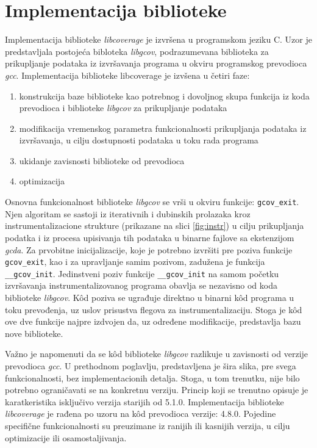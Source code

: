 \documentclass[12pt,oneside]{memoir}
\newcommand{\kod}[1]{\texttt{#1}}
\newcommand{\strano}[1]{\textit{#1}}
\begin{document}
\section{Implementacija biblioteke}

Implementacija biblioteke \strano{libcoverage} je izvršena u programskom jeziku C. Uzor je predstavljala postojeća bibloteka \strano{libgcov}, podrazumevana biblioteka za prikupljanje podataka iz izvršavanja programa u okviru programskog prevodioca \strano{gcc}. Implementacija biblioteke libcoverage je izvšena u četiri faze:
\begin{enumerate}
\item konstrukcija baze biblioteke kao potrebnog i dovoljnog skupa funkcija iz koda prevodioca i biblioteke \strano{libgcov} za prikupljanje podataka
\item modifikacija vremenskog parametra funkcionalnosti prikupljanja podataka iz izvršavanja, u cilju dostupnosti podataka u toku rada programa
\item ukidanje zavisnosti biblioteke od prevodioca
\item optimizacija
\end{enumerate}


Osnovna funkcionalnost biblioteke \strano{libgcov} se vrši u okviru funkcije: \kod{gcov\_exit}. Njen algoritam se sastoji iz iterativnih i dubinskih prolazaka kroz instrumentalizacione strukture (prikazane na slici \ref{fig:instr}) u cilju prikupljanja podatka i iz procesa upisivanja tih podataka u binarne fajlove sa ekstenzijom \strano{gcda}. Za prvobitne inicijalizacije, koje je potrebno izvršiti pre poziva funkcije \kod{gcov\_exit}, kao i za upravljanje samim pozivom, zadužena je funkcija \kod{\_\_gcov\_init}. Jedinstveni poziv funkcije \kod{\_\_gcov\_init} na samom početku izvršavanja instrumentalizovanog programa obavlja se nezavisno od koda biblioteke \strano{libgcov}. K\^{o}d poziva se ugrađuje direktno u binarni k\^{o}d programa u toku prevođenja, uz uslov prisustva flegova za instrumentalizaciju. Stoga je k\^{o}d ove dve funkcije najpre izdvojen da, uz određene modifikacije, predstavlja bazu nove biblioteke. 

Važno je napomenuti da se k\^{o}d biblioteke \strano{libgcov} razlikuje u zavisnosti od verzije prevodioca \strano{gcc}. U prethodnom poglavlju, predstavljena je šira slika, pre svega funkcionalnosti, bez implementacionih detalja. Stoga, u tom trenutku, nije bilo potrebno ograničavati se na konkretnu verziju. Princip koji se trenutno opisuje je karatkeristika isključivo verzija starijih od 5.1.0. Implementacija biblioteke \strano{libcoverage} je rađena po uzoru na k\^{o}d prevodioca verzije: 4.8.0. Pojedine specifične funkcionalnosti su preuzimane iz ranijih ili kasnijih verzija, u cilju optimizacije ili osamostaljivanja. 
\end{document}

